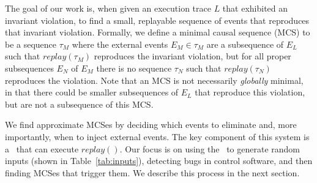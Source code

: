 The goal of our work is, when given an execution trace $L$ that exhibited an
invariant violation, to find a small, replayable sequence of events that reproduces that
invariant violation. Formally, we define a minimal causal sequence (MCS)
to be a sequence $\tau_M$ where the external events $E_M \in \tau_M$ are a
subsequence of $E_L$ such
that $replay(\tau_M)$ reproduces the invariant violation, but for all proper
subsequences $E_N$ of $E_M$
there is no sequence $\tau_N$ such that $replay(\tau_N)$ reproduces the violation.
Note that an MCS is not necessarily {\em globally} minimal, in that there could be smaller
subsequences of $E_L$ that reproduce this violation, but are not a subsequence of this MCS.

We find approximate MCSes by deciding
which events to eliminate and, more importantly, when to inject external
events. The key component of this system is a \tester~that can execute $replay()$.
Our focus is on using the \tester~to generate random inputs (shown in
Table~\ref{tab:inputs}), detecting bugs in control software,
and then finding MCSes that trigger them.
We describe this process in the next section.
